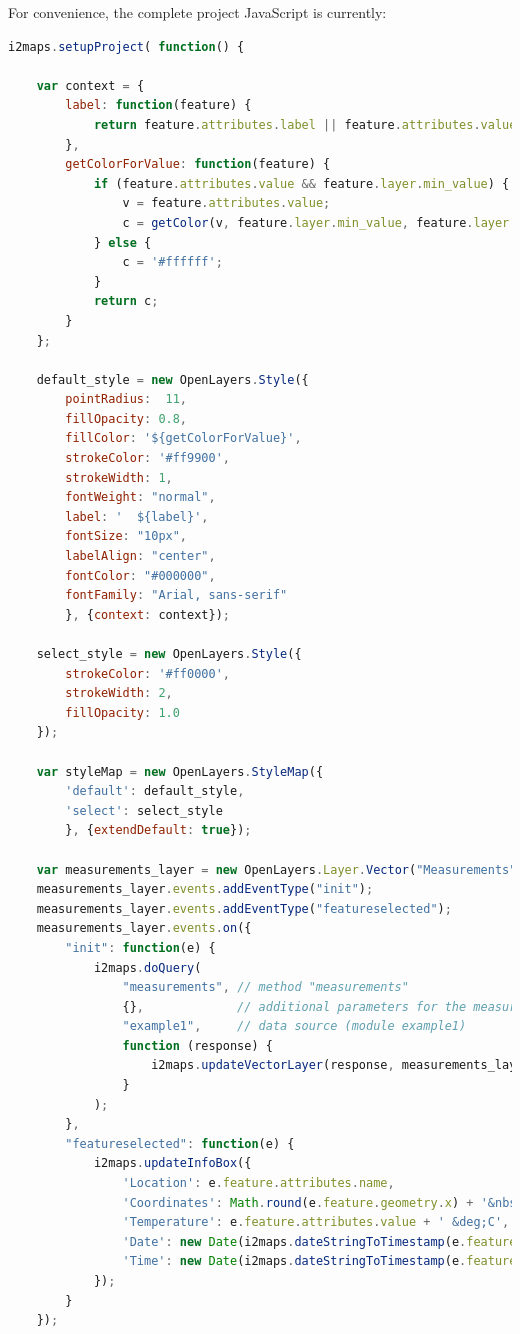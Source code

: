 \documentclass[11pt]{article}
\begin{document}
For convenience, the complete project JavaScript is currently:

\begin{lstlisting}[language=JavaScript]
i2maps.setupProject( function() {
    
    var context = {
        label: function(feature) {
            return feature.attributes.label || feature.attributes.value || '';
        },
        getColorForValue: function(feature) {
            if (feature.attributes.value && feature.layer.min_value) {
                v = feature.attributes.value;
                c = getColor(v, feature.layer.min_value, feature.layer.max_value, "hex");
            } else {
                c = '#ffffff';
            }
            return c;
        }
    };

    default_style = new OpenLayers.Style({
        pointRadius:  11,
        fillOpacity: 0.8,
        fillColor: '${getColorForValue}',
        strokeColor: '#ff9900',
        strokeWidth: 1,
        fontWeight: "normal",
        label: '  ${label}',
        fontSize: "10px",
        labelAlign: "center",
        fontColor: "#000000",
        fontFamily: "Arial, sans-serif"
        }, {context: context});

    select_style = new OpenLayers.Style({
        strokeColor: '#ff0000',
        strokeWidth: 2,
        fillOpacity: 1.0
    });

    var styleMap = new OpenLayers.StyleMap({
        'default': default_style,
        'select': select_style
        }, {extendDefault: true});

    var measurements_layer = new OpenLayers.Layer.Vector("Measurements", {styleMap: styleMap});
    measurements_layer.events.addEventType("init");
    measurements_layer.events.addEventType("featureselected");
    measurements_layer.events.on({
        "init": function(e) {
            i2maps.doQuery(
                "measurements", // method "measurements"
                {},             // additional parameters for the measurements method
                "example1",     // data source (module example1)
                function (response) {
                    i2maps.updateVectorLayer(response, measurements_layer)
                }
            );
        },
        "featureselected": function(e) {
            i2maps.updateInfoBox({
                'Location': e.feature.attributes.name,
                'Coordinates': Math.round(e.feature.geometry.x) + '&nbsp;/&nbsp;' + Math.round(e.feature.geometry.y),
                'Temperature': e.feature.attributes.value + ' &deg;C',
                'Date': new Date(i2maps.dateStringToTimestamp(e.feature.attributes.time)).toLocaleDateString(),
                'Time': new Date(i2maps.dateStringToTimestamp(e.feature.attributes.time)).toLocaleTimeString()
            });
        }
    });



\end{lstlisting}
\end{document}
